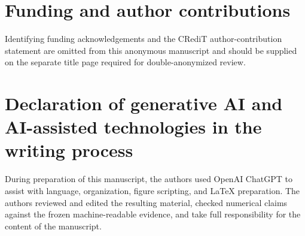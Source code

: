 \section*{Funding and author contributions}

Identifying funding acknowledgements and the CRediT author-contribution statement are omitted from this anonymous manuscript and should be supplied on the separate title page required for double-anonymized review.

\section*{Declaration of generative AI and AI-assisted technologies in the writing process}

During preparation of this manuscript, the authors used OpenAI ChatGPT to assist with language, organization, figure scripting, and LaTeX preparation. The authors reviewed and edited the resulting material, checked numerical claims against the frozen machine-readable evidence, and take full responsibility for the content of the manuscript.

